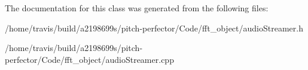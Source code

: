 The documentation for this class was generated from the following files\-:\begin{DoxyCompactItemize}
\item 
/home/travis/build/a2198699s/pitch-\/perfector/\-Code/fft\-\_\-object/audio\-Streamer.\-h\item 
/home/travis/build/a2198699s/pitch-\/perfector/\-Code/fft\-\_\-object/audio\-Streamer.\-cpp\end{DoxyCompactItemize}
